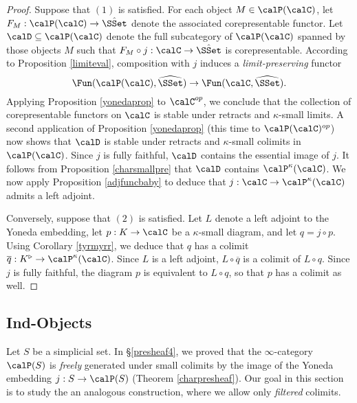 \begin{proof}
Suppose that $(1)$ is satisfied. For each object
$M \in \calP(\calC)$, let $F_M: \calP(\calC) \rightarrow \hat{\SSet}$ denote the associated corepresentable functor. Let $\calD \subseteq \calP(\calC)$
denote the full subcategory of $\calP(\calC)$ spanned by those objects $M$
such that $F_M \circ j: \calC \rightarrow \hat{\SSet}$ is corepresentable.
According to Proposition \ref{limiteval}, composition with $j$ induces a {\em limit-preserving} functor
$$ \Fun(\calP(\calC), \widehat{\SSet}) \rightarrow \Fun(\calC, \widehat{\SSet}).$$
Applying Proposition \ref{yonedaprop} to $\calC^{op}$, we conclude that the collection
of corepresentable functors on $\calC$ is stable under retracts and $\kappa$-small limits.
A second application of Proposition \ref{yonedaprop} (this time to 
$\calP(\calC)^{op}$) now shows that $\calD$ is stable under retracts
and $\kappa$-small colimits in $\calP(\calC)$. Since $j$ is fully faithful, $\calD$ contains the essential image of $j$. It follows from Proposition \ref{charsmallpre} that $\calD$ contains
$\calP^{\kappa}(\calC)$. We now apply Proposition \ref{adjfuncbaby} to deduce that
$j: \calC \rightarrow \calP^{\kappa}(\calC)$ admits a left adjoint.

Conversely, suppose that $(2)$ is satisfied. Let $L$ denote a left adjoint to the Yoneda embedding, let
$p: K \rightarrow \calC$ be a $\kappa$-small diagram, and let
$q = j \circ p$. Using Corollary \ref{tyrmyrr}, we deduce that $q$ has a colimit
$\overline{q}: K^{\triangleright} \rightarrow \calP^{\kappa}(\calC)$. Since $L$ is a left adjoint,
$L \circ \overline{q}$ is a colimit of $L \circ q$. Since $j$ is fully faithful, the diagram
$p$ is equivalent to $L \circ q$, so that $p$ has a colimit as well.
\end{proof}

\subsection{Ind-Objects}\label{indlim}

Let $S$ be a simplicial set. In \S \ref{presheaf4}, we proved that the $\infty$-category
$\calP(S)$ is {\em freely} generated under small colimits by the image of the Yoneda embedding $j: S \rightarrow \calP(S)$ (Theorem \ref{charpresheaf}). Our goal in this section is to study
the an analogous construction, where we allow only {\em filtered} colimits.

